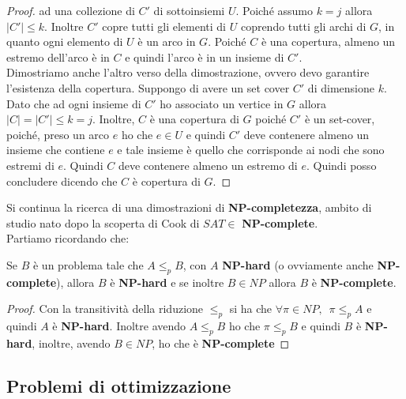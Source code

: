 \documentclass[a4paper,12pt, oneside]{book}
\begin{document}
\begin{proof}
  ad una collezione di $C'$ di sottoinsiemi $U$. Poiché assumo $k=j$ allora
  $|C'|\leq k$. Inoltre $C'$ copre tutti gli elementi di $U$ coprendo tutti gli
  archi di $G$, in quanto ogni elemento di $U$ è un arco in $G$. Poiché $C$ è
  una copertura, almeno un estremo dell’arco è in $C$  e quindi l’arco è in un
  insieme di $C'$.\\
  Dimostriamo anche l'altro verso della dimostrazione, ovvero devo garantire
  l'esistenza della copertura. Suppongo di avere un set cover $C'$ di dimensione
  $k$. Dato che ad ogni insieme di $C'$ ho associato un vertice in $G$ allora
  $|C|=|C'|\leq k=j$. Inoltre, $C$ è una copertura di $G$ poiché $C'$ è un
  set-cover, poiché, preso un arco $e$ ho che $e\in U$ e quindi $C'$ deve
  contenere almeno un insieme che contiene $e$ e tale insieme è quello che
  corrisponde ai nodi che sono estremi di $e$. Quindi $C$ deve contenere almeno
  un estremo di $e$. Quindi posso concludere dicendo che $C$ è copertura di $G$.
\end{proof}
Si continua la ricerca di una dimostrazioni di \textbf{NP-completezza}, ambito
di studio nato dopo la scoperta di Cook di $SAT\in$ \textbf{NP-complete}.\\
Partiamo ricordando che:
\begin{teorema}
  Se $B$ è un problema tale che $A\leq_p B$, con $A$
  \textbf{NP-hard} (o ovviamente anche \textbf{NP-complete}), allora $B$ è
  \textbf{NP-hard} e se inoltre $B\in NP$ allora $B$ è \textbf{NP-complete}.  
\end{teorema}
\begin{proof}
  Con la transitività della riduzione $\leq_p$ si ha che $\forall\pi\in
  NP,\,\,\, \pi\leq_p A$ e quindi $A$ è \textbf{NP-hard}. Inoltre avendo
  $A\leq_p B$ ho che  $\pi\leq_p B$ e quindi $B$ è \textbf{NP-hard}, inoltre,
  avendo $B\in NP$, ho che è \textbf{NP-complete}
\end{proof}


\subsection{Problemi di ottimizzazione}
\end{document}
